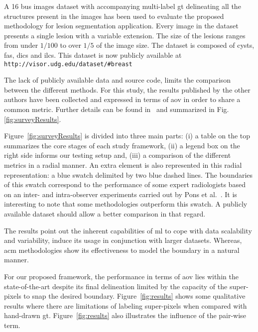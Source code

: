 A 16 \ac{bus} images dataset with accompanying multi-label \ac{gt} delineating all the structures present in the images has been used to evaluate the proposed methodology for lesion segmentation application.
Every image in the dataset presents a single lesion with a variable extension.
The size of the lesions ranges from under $1/100$ to over $1/5$ of the image size.
The dataset is composed of cysts, \acp{fa}, \acp{dic} and \acp{ilc}. This dataset is now publicly available at \texttt{http://visor.udg.edu/dataset/#breast}

The lack of publicly available data and source code, limits the comparison between the
different methods.
For this study, the results published by the other authors have been collected and expressed in terms of \ac{aov} in order to share a common metric.
Further details can be found in~\cite{massich2013phd} and summarized in Fig.\,\ref{fig:surveyResults}.

Figure~\ref{fig:surveyResults} is divided into three main parts: (i) a table on the top summarizes the core stages of each study framework, (ii) a legend box on the right side informs our testing setup and, (iii) a comparison of the different metrics in a radial manner. An extra element is also represented in this radial representation: a blue swatch delimited by two blue dashed lines. The boundaries of this swatch correspond to the performance of some expert radiologists based on an inter- and intra-observer experiments carried out by Pons et al.~\cite{gerard2013}.
It is interesting to note that some methodologies outperform this swatch.
A publicly available dataset should allow a better comparison in that regard.

The results point out the inherent capabilities of \ac{ml} to cope with data scalability and variability, induce its usage in conjunction with larger datasets.
Whereas, \ac{acm} methodologies show its effectiveness to model the boundary in a natural manner.

For our proposed framework, the performance in terms of \ac{aov} lies within the state-of-the-art despite its final delineation
limited by the capacity of the super-pixels to snap the desired boundary.
Figure~\ref{fig:results} shows some qualitative results where there are limitations of labeling super-pixels when compared with hand-drawn \ac{gt}.
Figure~\ref{fig:results} also illustrates the influence of the pair-wise term.

